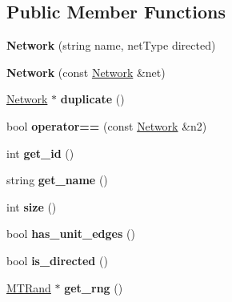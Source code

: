 \subsection*{Public Member Functions}
\begin{DoxyCompactItemize}
\item 
\hypertarget{classNetwork_ae75eec96cb0933276170cd5b1a5d715e}{}{\bfseries Network} (string name, net\+Type directed)\label{classNetwork_ae75eec96cb0933276170cd5b1a5d715e}

\item 
\hypertarget{classNetwork_a8f7bc88d89cf3f52600b792bb9985010}{}{\bfseries Network} (const \hyperlink{classNetwork}{Network} \&net)\label{classNetwork_a8f7bc88d89cf3f52600b792bb9985010}

\item 
\hypertarget{classNetwork_a00a122e905f834927294533dd1e99788}{}\hyperlink{classNetwork}{Network} $\ast$ {\bfseries duplicate} ()\label{classNetwork_a00a122e905f834927294533dd1e99788}

\item 
\hypertarget{classNetwork_adb84b687ca9b3898ac7de910654dc6ed}{}bool {\bfseries operator==} (const \hyperlink{classNetwork}{Network} \&n2)\label{classNetwork_adb84b687ca9b3898ac7de910654dc6ed}

\item 
\hypertarget{classNetwork_af24aaed953f573bb2b19a1db78734fb0}{}int {\bfseries get\+\_\+id} ()\label{classNetwork_af24aaed953f573bb2b19a1db78734fb0}

\item 
\hypertarget{classNetwork_a37e0e9e2db034f6b549a9a0198cd9d75}{}string {\bfseries get\+\_\+name} ()\label{classNetwork_a37e0e9e2db034f6b549a9a0198cd9d75}

\item 
\hypertarget{classNetwork_a0da93244ee6aa2c51af37aa193481330}{}int {\bfseries size} ()\label{classNetwork_a0da93244ee6aa2c51af37aa193481330}

\item 
\hypertarget{classNetwork_afbf84b31a0cc3fa9d41411fae0afcb46}{}bool {\bfseries has\+\_\+unit\+\_\+edges} ()\label{classNetwork_afbf84b31a0cc3fa9d41411fae0afcb46}

\item 
\hypertarget{classNetwork_a5bc3e3d4a34b0a5d888c291c8946db75}{}bool {\bfseries is\+\_\+directed} ()\label{classNetwork_a5bc3e3d4a34b0a5d888c291c8946db75}

\item 
\hypertarget{classNetwork_a15b38693e92c7f62e3d6c7c8c1227499}{}\hyperlink{classMTRand}{M\+T\+Rand} $\ast$ {\bfseries get\+\_\+rng} ()\label{classNetwork_a15b38693e92c7f62e3d6c7c8c1227499}


\end{DoxyCompactItemize}
